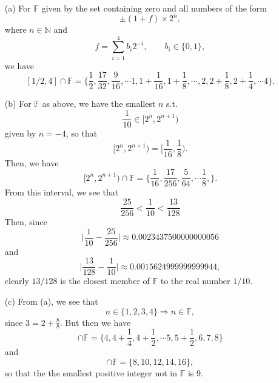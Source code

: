 
\begin{itemize}
    \item[(a)]
        For $\mathbb{F}$ given by the set containing zero and all numbers
        of the form
        \[
           \pm (1 + f) \times 2^n, 
        \]
        where $n \in \mathbb{N}$ and
        \[
            f = \sum_{i=1}^4 b_i 2^{-i}, \qquad b_i \in \lbrace 0, 1 \rbrace,
        \]
        we have
        \[
            [1/2, 4] \cap \mathbb{F} = \biggl\lbrace \frac{1}{2}, \frac{17}{32}, 
            \frac{9}{16}, \dotsb
            1, 1 + \frac{1}{16}, 1 + \frac{1}{8}, \dotsb, 2, 2 + \frac{1}{8},
            2 + \frac{1}{4}, \dotsb 4 \biggr\rbrace.
        \]
    \item[(b)]
        For $\mathbb{F}$ as above, we have the smallest $n$ s.t. 
        \[
            \frac{1}{10} \in [2^n, 2^{n+1})
        \]
        given by $n = -4$, so that
        \[
            [2^n, 2^{n+1}) = \biggl[\frac{1}{16}, \frac{1}{8}\biggr).
        \]
        Then, we have
        \[
            [2^n, 2^{n+1}) \cap \mathbb{F} = \biggl\lbrace \frac{1}{16}, 
            \frac{17}{256}, \frac{5}{64}, \dotsb \frac{1}{8}, \biggr\rbrace.
        \]
        From this interval, we see that
        \[
            \frac{25}{256} < \frac{1}{10} < \frac{13}{128}
        \]
        Then, since 
        \[
            \biggl\lvert \frac{1}{10} - \frac{25}{256} \biggr\rvert \approx 
            0.0023437500000000056
        \]
        and
        \[
            \biggl\lvert \frac{13}{128} - \frac{1}{10} \biggr\rvert \approx 
            0.0015624999999999944,
        \]
        clearly $13/128$ is the closest member of $\mathbb{F}$ to the real number 
        $1/10$.
    \item[(c)]
        From (a), we see that 
        \[
            n \in \lbrace 1, 2, 3, 4 \rbrace \Rightarrow n \in \mathbb{F},
        \]
        since $3 = 2 + \frac{8}{8}$. But then we have
        \begin{equation*}
            [4, 8] \cap \mathbb{F} = \biggl\lbrace 4, 4 + \frac{1}{4}, 
            4 + \frac{1}{2}, \dotsb
            5, 5 + \frac{1}{2}, 6, 7, 8\biggr\rbrace
        \end{equation*}
        and
        \begin{equation*}
            [8, 16] \cap \mathbb{F} = \lbrace 8, 10, 12, 14, 16 \rbrace,
        \end{equation*}
        so that the the smallest positive integer not in $\mathbb{F}$ is 9.
\end{itemize}
